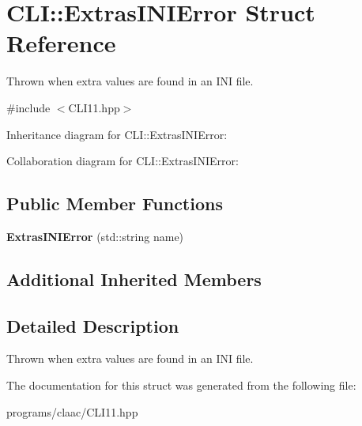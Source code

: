 \hypertarget{struct_c_l_i_1_1_extras_i_n_i_error}{}\section{C\+LI\+:\+:Extras\+I\+N\+I\+Error Struct Reference}
\label{struct_c_l_i_1_1_extras_i_n_i_error}


Thrown when extra values are found in an I\+NI file.  




{\ttfamily \#include $<$C\+L\+I11.\+hpp$>$}



Inheritance diagram for C\+LI\+:\+:Extras\+I\+N\+I\+Error\+:


Collaboration diagram for C\+LI\+:\+:Extras\+I\+N\+I\+Error\+:
\subsection*{Public Member Functions}
\begin{DoxyCompactItemize}
\item 
\mbox{\label{struct_c_l_i_1_1_extras_i_n_i_error_a6bc4f7828c0439027cc5eb928d2e39fd}} 
{\bfseries Extras\+I\+N\+I\+Error} (std\+::string name)
\end{DoxyCompactItemize}
\subsection*{Additional Inherited Members}


\subsection{Detailed Description}
Thrown when extra values are found in an I\+NI file. 

The documentation for this struct was generated from the following file\+:\begin{DoxyCompactItemize}
\item 
programs/claac/C\+L\+I11.\+hpp\end{DoxyCompactItemize}
